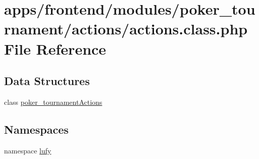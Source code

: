 \hypertarget{frontend_2modules_2poker__tournament_2actions_2actions_8class_8php}{\section{apps/frontend/modules/poker\-\_\-tournament/actions/actions.class.\-php File Reference}
\label{frontend_2modules_2poker__tournament_2actions_2actions_8class_8php}
}
\subsection*{Data Structures}
\begin{DoxyCompactItemize}
\item 
class \hyperlink{classpoker__tournament_actions}{poker\-\_\-tournament\-Actions}
\end{DoxyCompactItemize}
\subsection*{Namespaces}
\begin{DoxyCompactItemize}
\item 
namespace \hyperlink{namespacelufy}{lufy}
\end{DoxyCompactItemize}
